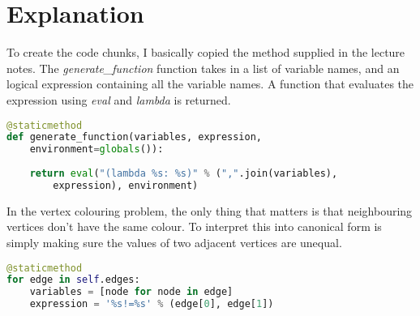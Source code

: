 \documentclass{article}
\begin{document}
\section{Explanation}
To create the code chunks, I basically copied the method supplied in the lecture notes. The \textit{generate\_function} function takes in a list of variable names, and an logical expression containing all the variable names. A function that evaluates the expression using \textit{eval} and \textit{lambda} is returned.
\begin{lstlisting}[language=Python]
@staticmethod
def generate_function(variables, expression,
    environment=globals()):
	
    return eval("(lambda %s: %s)" % (",".join(variables),
        expression), environment)
\end{lstlisting}
In the vertex colouring problem, the only thing that matters is that neighbouring vertices don't have the same colour. To interpret this into canonical form is simply making sure the values of two adjacent vertices are unequal.
\begin{lstlisting}[language=Python]
@staticmethod
for edge in self.edges:
    variables = [node for node in edge]
    expression = '%s!=%s' % (edge[0], edge[1])
\end{lstlisting}

\end{document}
